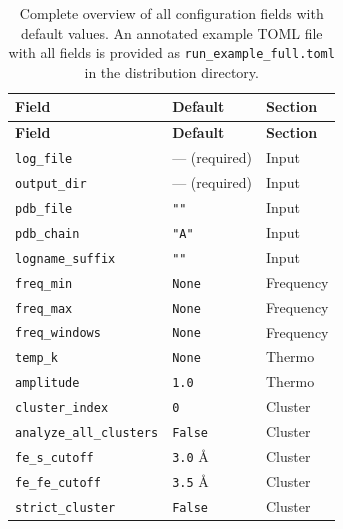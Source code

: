 \documentclass[11pt,a4paper,twoside]{article}
\theoremstyle{remark}
\begin{document}
\begin{longtable}{p{} p{} p{}}
\caption{Complete overview of all configuration fields with default
values. An annotated example TOML file with all fields is provided
as \texttt{run\_example\_full.toml} in the distribution directory.}
\label{tab:param-overview} \\
\toprule
\textbf{Field} & \textbf{Default} & \textbf{Section} \\
\midrule
\endfirsthead
\toprule
\textbf{Field} & \textbf{Default} & \textbf{Section} \\
\midrule
\endhead
\texttt{log\_file}                  & --- (required)        & Input \\
\texttt{output\_dir}                & --- (required)        & Input \\
\texttt{pdb\_file}                  & \texttt{""}          & Input \\
\texttt{pdb\_chain}                 & \texttt{"A"}         & Input \\
\texttt{logname\_suffix}            & \texttt{""}          & Input \\
\midrule
\texttt{freq\_min}                  & \texttt{None}        & Frequency \\
\texttt{freq\_max}                  & \texttt{None}        & Frequency \\
\texttt{freq\_windows}              & \texttt{None}        & Frequency \\
\midrule
\texttt{temp\_k}                    & \texttt{None}        & Thermo \\
\texttt{amplitude}                  & \texttt{1.0}         & Thermo \\
\midrule
\texttt{cluster\_index}             & \texttt{0}           & Cluster \\
\texttt{analyze\_all\_clusters}     & \texttt{False}       & Cluster \\
\texttt{fe\_s\_cutoff}              & \texttt{3.0} \AA     & Cluster \\
\texttt{fe\_fe\_cutoff}             & \texttt{3.5} \AA     & Cluster \\
\texttt{strict\_cluster}            & \texttt{False}       & Cluster \\
\midrule

\end{longtable}
\end{document}
